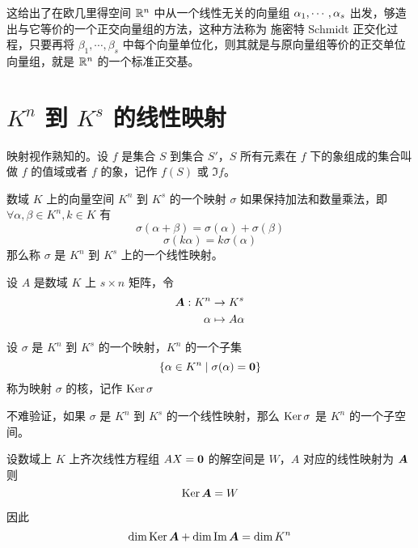 这给出了在欧几里得空间 $\mathbb{R}^n$ 中从一个线性无关的向量组 $\alpha_1,\cdots,\alpha_s$ 出发，够造出与它等价的一个正交向量组的方法，这种方法称为 施密特 Schmidt 正交化过程，只要再将 $\beta_1,\cdots,\beta_s$ 中每个向量单位化，则其就是与原向量组等价的正交单位向量组，就是 $\mathbb{R}^n$ 的一个标准正交基。

\section{\texorpdfstring{$K^n$ 到 $K^s$ 的线性映射}{Kn 到 Ks 的线性映射}}

映射视作熟知的。设 $f$ 是集合 $S$ 到集合 $S'$，$S$ 所有元素在 $f$ 下的象组成的集合叫做 $f$ 的值域或者 $f$ 的象，记作 $f(S)$ 或 $\Im f$。

\begin{definition}
    数域 $K$ 上的向量空间 $K^n$ 到 $K^s$ 的一个映射 $\sigma$ 如果保持加法和数量乘法，即 $\forall \alpha,\beta \in K^n,k\in K$ 有
    \[\sigma (\alpha+\beta) = \sigma(\alpha) + \sigma(\beta)\]
    \[\sigma(k\alpha) = k\sigma(\alpha)\]
    那么称 $\sigma$ 是 $K^n$ 到 $K^s$ 上的一个线性映射。
\end{definition}

设 $A$ 是数域 $K$ 上 $s \times n$ 矩阵，令
\begin{equation*}
    \begin{aligned}
        \boldsymbol{A} : K^n & \rightarrow K^s \\
        \alpha &\mapsto A\alpha
    \end{aligned}
\end{equation*}


\begin{definition}
    设 $\sigma$ 是 $K^n$ 到 $K^s$ 的一个映射，$K^n$ 的一个子集
    \[ \{ \alpha \in K^n \mid \sigma(\alpha) = \boldsymbol{0} \} \]
    称为映射 $\sigma$ 的核，记作 $\operatorname{Ker} \sigma$
\end{definition}

不难验证，如果 $\sigma$ 是 $K^n$ 到 $K^s$ 的一个线性映射，那么 $\operatorname{Ker} \sigma$ 是 $K^n$ 的一个子空间。

\begin{theorem}
    设数域上 $K$ 上齐次线性方程组 $AX = \boldsymbol{0}$ 的解空间是 $W$，$A$ 对应的线性映射为 $\boldsymbol{A}$ 则
    \[ \operatorname{Ker} \boldsymbol{A} = W \]
\end{theorem}

因此
\[ \dim \operatorname{Ker} \boldsymbol{A} + \dim \operatorname{Im} \boldsymbol{A} = \dim K^n \]
